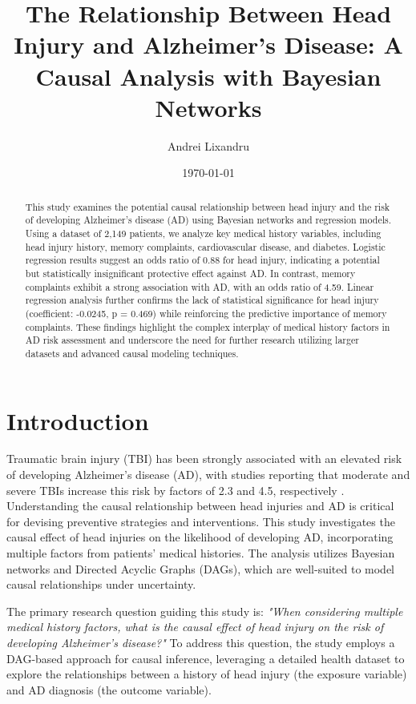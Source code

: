 \documentclass[12pt]{article}
\title{The Relationship Between Head Injury and Alzheimer’s Disease: A Causal Analysis with Bayesian Networks}
\author[1]{Andrei Lixandru}
\affil[1]{Radboud University, Department of Machine Learning and Neural Computing, The Netherlands}
\date{\today}
\begin{document}
\maketitle

\begin{abstract}
This study examines the potential causal relationship between head injury and the risk of developing Alzheimer's disease (AD) using Bayesian networks and regression models. Using a dataset of 2,149 patients, we analyze key medical history variables, including head injury history, memory complaints, cardiovascular disease, and diabetes. Logistic regression results suggest an odds ratio of 0.88 for head injury, indicating a potential but statistically insignificant protective effect against AD. In contrast, memory complaints exhibit a strong association with AD, with an odds ratio of 4.59. Linear regression analysis further confirms the lack of statistical significance for head injury (coefficient: -0.0245, p = 0.469) while reinforcing the predictive importance of memory complaints. These findings highlight the complex interplay of medical history factors in AD risk assessment and underscore the need for further research utilizing larger datasets and advanced causal modeling techniques.
\end{abstract}

\tableofcontents

\section{Introduction}

Traumatic brain injury (TBI) has been strongly associated with an elevated risk of developing Alzheimer's disease (AD), with studies reporting that moderate and severe TBIs increase this risk by factors of 2.3 and 4.5, respectively \cite{gottlieb2000head}. Understanding the causal relationship between head injuries and AD is critical for devising preventive strategies and interventions. This study investigates the causal effect of head injuries on the likelihood of developing AD, incorporating multiple factors from patients' medical histories. The analysis utilizes Bayesian networks and Directed Acyclic Graphs (DAGs), which are well-suited to model causal relationships under uncertainty.

The primary research question guiding this study is: \textit{"When considering multiple medical history factors, what is the causal effect of head injury on the risk of developing Alzheimer's disease?"} To address this question, the study employs a DAG-based approach for causal inference, leveraging a detailed health dataset to explore the relationships between a history of head injury (the exposure variable) and AD diagnosis (the outcome variable).
\end{document}
